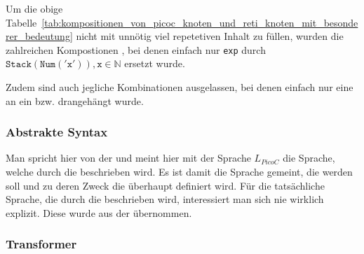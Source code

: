 \begin{Special_Paragraph}
  Um die obige Tabelle~\ref{tab:kompositionen_von_picoc_knoten_und_reti_knoten_mit_besonderer_bedeutung} nicht mit unnötig viel repetetiven Inhalt zu füllen, wurden die zahlreichen Kompostionen , bei denen einfach nur \verb|exp| durch $\mathtt{Stack(Num('x')), x}\in\mathbb{N}$ ersetzt wurde.

  Zudem sind auch jegliche Kombinationen ausgelassen, bei denen einfach nur eine  an ein  bzw.   drangehängt wurde.
\end{Special_Paragraph}

\subsubsection{Abstrakte Syntax}
\label{sec:abstrakte_syntax}

\newpage

\begin{grammar}
  \toprule
  \commentsecond
  \midrule
  \arith
  \midrule
  \logic
  \midrule
  \assign
  \midrule
  \pntr
  \midrule
  \arraysecond
  \midrule
  \struct
  \midrule
  \ifelse
  \midrule
  \loopsecond
  \midrule
  \fun
  \midrule
  \file
  \bottomrule
\end{grammar}

\begin{Special_Paragraph}
  Man spricht hier von der  und meint hier mit der Sprache $L_{PicoC}$  die Sprache, welche durch die  beschrieben wird. Es ist damit  die Sprache gemeint, die  werden soll und zu deren Zweck die  überhaupt definiert wird. Für die tatsächliche Sprache, die durch die  beschrieben wird, interessiert man sich nie wirklich explizit. Diese  wurde aus der  \cite{g_siek_course_2022} übernommen.
\end{Special_Paragraph}


\subsubsection{Transformer}

